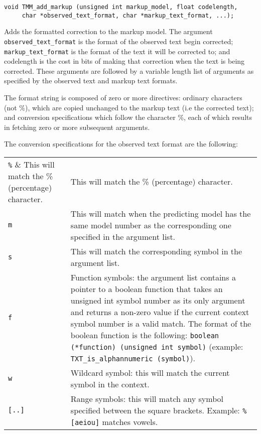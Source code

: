 \documentclass[11pt]{article}
\begin{document}
{\begin{verbatim}
void TMM_add_markup (unsigned int markup_model, float codelength,
     char *observed_text_format, char *markup_text_format, ...);
\end{verbatim}

\vspace{-0.2cm}
Adds the formatted correction to the markup model. The argument \verb|observed_text_format| is the format of the observed text
begin corrected; \verb|markup_text_format| is the format of the text it will be corrected to; and codelength is the
cost in bits of making that correction when the text is being corrected. These arguments are followed by a variable length
list of arguments as specified by the observed text and markup text formats.

The format string is composed of zero or more directives: ordinary characters (not \%),
which are copied unchanged to the markup text (i.e the corrected text); and conversion specifications which follow
the character \%, each of which results in fetching zero or more subsequent arguments.

The conversion specifications for the observed text format are the following:

\begin{tabular}{lp{12.8cm}}
\verb|%|    & This will match the \% (percentage) character. \\
\verb|m|    & This will match when the predicting model has the same model number as the
              corresponding one specified in the argument list. \\
\verb|s|    & This will match the corresponding symbol in the argument list. \\
\verb|f|    & Function symbols: the argument list contains a pointer to a boolean function that takes an
              unsigned int symbol number as its only argument and returns a non-zero value
              if the current context symbol number is a valid match. The format of the boolean
              function is the following: \verb|boolean (*function) (unsigned int symbol)|
              (example: \verb|TXT_is_alphannumeric (symbol)|). \\
\verb|w|    & Wildcard symbol: this will match the current symbol in the context. \\
\verb|[..]| & Range symbols: this will match any symbol specified between the
              square brackets. Example: \verb|%[aeiou]| matches vowels. \\
\end{tabular}


}
\end{document}
